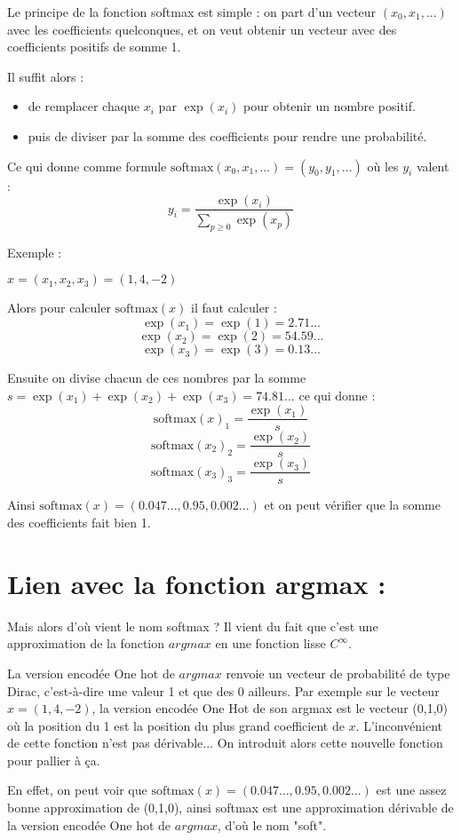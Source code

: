 \documentclass{article}
\begin{document}
Le principe de la fonction softmax est simple : on part d'un vecteur $(x_0,x_1,...)$ avec les coefficients quelconques, et on veut obtenir un vecteur avec des coefficients positifs de somme 1.

Il suffit alors :
\begin{itemize}
    \item de remplacer chaque $x_i$ par $\exp(x_i)$ pour obtenir un nombre positif.
    \item puis de diviser par la somme des coefficients pour rendre une probabilité.
\end{itemize}

Ce qui donne comme formule $\text{softmax}(x_0,x_1,...) = (y_0,y_1,...)$ où les $y_i$ valent :
\[y_i = \frac{\exp(x_i)}{\sum_{p \geq 0} \exp(x_p)}\]

Exemple :

$x = (x_1,x_2,x_3) = (1,4,-2)$

Alors pour calculer $\text{softmax}(x)$ il faut calculer :
\[\exp(x_1) = \exp(1) = 2.71...\]
\[\exp(x_2) = \exp(2) = 54.59...\]
\[\exp(x_3) = \exp(3) = 0.13...\]

Ensuite on divise chacun de ces nombres par la somme $s = \exp(x_1) + \exp(x_2) + \exp(x_3) = 74.81...$ ce qui donne :
\[\text{softmax}(x)_1 = \frac{\exp(x_1)}{s}\]
\[\text{softmax}(x_2)_2 = \frac{\exp(x_2)}{s}\]
\[\text{softmax}(x_3)_3 = \frac{\exp(x_3)}{s}\]

Ainsi $\text{softmax}(x) = (0.047...,0.95,0.002...)$ et on peut vérifier que la somme des coefficients fait bien 1.

\section*{Lien avec la fonction argmax :}

Mais alors d'où vient le nom softmax ? Il vient du fait que c'est une approximation de la fonction $argmax$ en une fonction lisse $C^{\infty}$.

La version encodée One hot de $argmax$ renvoie un vecteur de probabilité de type Dirac, c'est-à-dire une valeur 1 et que des 0 ailleurs. Par exemple sur le vecteur $x = (1,4,-2)$, la version encodée One Hot de son argmax est le vecteur (0,1,0) où la position du 1 est la position du plus grand coefficient de $x$. L'inconvénient de cette fonction n'est pas dérivable... On introduit alors cette nouvelle fonction pour pallier à ça. 

En effet, on peut voir que $\text{softmax}(x) = (0.047...,0.95,0.002...)$ est une assez bonne approximation de (0,1,0), ainsi softmax est une approximation dérivable de la version encodée One hot de $argmax$, d'où le nom "soft".
\end{document}
